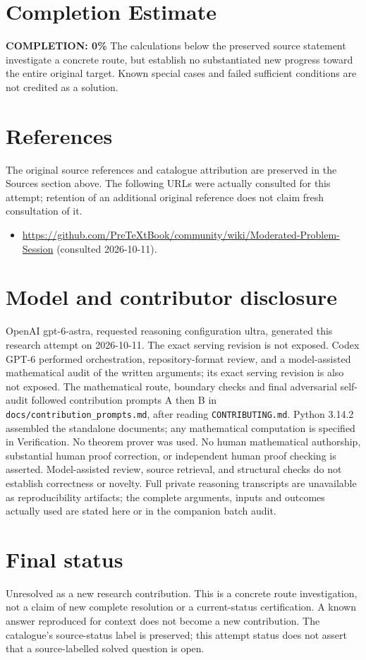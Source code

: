 \documentclass[11pt]{article}
\begin{document}
\section{Completion Estimate}
\noindent\textbf{COMPLETION: 0\%}
The calculations below the preserved source statement investigate a concrete route,
but establish no substantiated new progress toward the entire original target.
Known special cases and failed sufficient conditions are not credited as a solution.
\section{References}
The original source references and catalogue attribution are preserved in the
Sources section above. The following URLs were actually consulted for this attempt;
retention of an additional original reference does not claim fresh consultation of it.
\begin{itemize}
\item \url{https://github.com/PreTeXtBook/community/wiki/Moderated-Problem-Session} (consulted 2026-10-11). 
\end{itemize}
\section{Model and contributor disclosure}
OpenAI gpt-6-astra, requested reasoning configuration ultra, generated this research
attempt on 2026-10-11. The exact serving revision is not exposed. Codex GPT-6
performed orchestration, repository-format review, and a model-assisted mathematical
audit of the written arguments; its exact serving revision
is also not exposed. The mathematical route, boundary checks and final adversarial
self-audit followed contribution prompts A then B in
\texttt{docs/contribution\_prompts.md}, after reading \texttt{CONTRIBUTING.md}.
Python 3.14.2 assembled the standalone documents; any mathematical computation is
specified in Verification. No theorem prover was used. No human mathematical
authorship, substantial human proof correction, or independent human proof checking
is asserted. Model-assisted review, source retrieval, and structural checks do not
establish correctness or novelty. Full private reasoning transcripts are unavailable
as reproducibility artifacts; the complete arguments, inputs and outcomes actually
used are stated here or in the companion batch audit.
\section{Final status}
Unresolved as a new research contribution. This is a concrete route investigation,
not a claim of new complete resolution or a current-status certification. A known
answer reproduced for context does not become a new contribution. The catalogue's
source-status label is preserved; this attempt status does not assert that a
source-labelled solved question is open.
\end{document}
